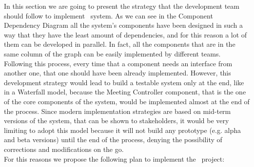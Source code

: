 In this section we are going to present the strategy that the development team should follow to implement \projectname~system. As we can see in the Component Dependency Diagram all the system's components have been designed in such a way that they have the least amount of dependencies, and for this reason a lot of them can be developed in parallel. In fact, all the components that are in the same column of the graph can be easily implemented by different teams. Following this process, every time that a component needs an interface from another one, that one should have been already implemented. However, this development strategy would lead to build a testable system only at the end, like in a Waterfall model, because the Meeting Controller component, that is the one of the core components of the system, would be implemented almost at the end of the process. Since modern implementation strategies are based on mid-term versions of the system, that can be shown to stakeholders, it would be very limiting to adopt this model because it will not build any prototype (e.g. alpha and beta versions) until the end of the process, denying the possibility of corrections and modifications on the go. \\
For this reasons we propose the following plan to implement the \projectname~project:


